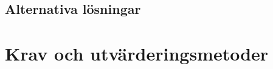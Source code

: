 \documentclass[swedish, a4paper,12pt]{article}
\begin{document}
\subsection{Alternativa lösningar}
%
%
%
%
%

\section{Krav och utvärderingsmetoder}\label{sec:krav}
\end{document}
